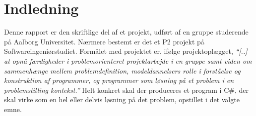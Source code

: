 \chapter{Indledning}\label{chap:indledning}



Denne rapport er den skriftlige del af et projekt, udført af en gruppe studerende på Aalborg Universitet.
Nærmere bestemt er det et P2 projekt på Softwareingeniørstudiet. Formålet med projektet er, ifølge
projektoplægget, \textit{``[..] at opnå færdigheder i problemorienteret projektarbejde i en gruppe samt viden
om sammenhænge mellem problemdefinition, modeldannelsers rolle i forståelse og konstruktion af programmer, og
programmer som løsning på et problem i en problemstilling kontekst.''} Helt konkret skal der produceres et program i C\#, der skal virke som en hel eller delvis løsning
på det problem, opstillet i det valgte emne.

